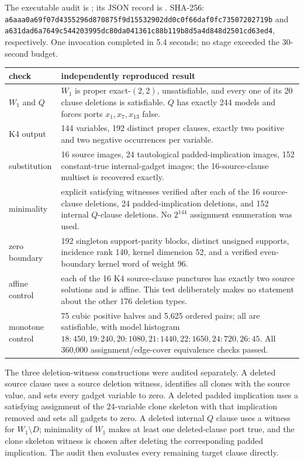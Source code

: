 \documentclass[11pt]{article}
\begin{document}
The executable audit is
; its JSON record is
.  SHA-256:
\texttt{a6aaa0a69f07d4355296d870875f9d15532902dd0c0f66daf0fc73507202719b}
and
\texttt{a631dad6a7649c544203995dc80da041361c88b119b8d5a4d848d2501cd63ed4},
respectively.  One invocation completed in 5.4 seconds; no stage exceeded the
30-second budget.

\begin{center}
\begin{tabularx}{\linewidth}{@{}lX@{}}
\toprule
check & independently reproduced result\\
\midrule
$W_1$ and $Q$ & $W_1$ is proper exact-$(2,2)$, unsatisfiable, and every one
of its 20 clause deletions is satisfiable.  $Q$ has exactly 244 models and
forces ports $x_1,x_7,x_{13}$ false.\\
K4 output & 144 variables, 192 distinct proper clauses, exactly two positive
and two negative occurrences per variable.\\
substitution & 16 source images, 24 tautological padded-implication images,
152 constant-true internal-gadget images; the 16-source-clause multiset is
recovered exactly.\\
minimality & explicit satisfying witnesses verified after each of the 16
source-clause deletions, 24 padded-implication deletions, and 152 internal
$Q$-clause deletions.  No $2^{144}$ assignment enumeration was used.\\
zero boundary & 192 singleton support-parity blocks, distinct unsigned
supports, incidence rank 140, kernel dimension 52, and a verified even-boundary
kernel word of weight 96.\\
affine control & each of the 16 K4 source-clause punctures has exactly two
source solutions and is affine.  This test deliberately makes no statement
about the other 176 deletion types.\\
monotone control & 75 cubic positive halves and 5,625 ordered pairs; all are
satisfiable, with model histogram
$18{:}450,19{:}240,20{:}1080,21{:}1440,22{:}1650,24{:}720,26{:}45$.
All 360,000 assignment/edge-cover equivalence checks passed.\\
\bottomrule
\end{tabularx}
\end{center}

The three deletion-witness constructions were audited separately.  A deleted
source clause uses a source deletion witness, identifies all clones with the
source value, and sets every gadget variable to zero.  A deleted padded
implication uses a satisfying assignment of the 24-variable clone skeleton
with that implication removed and sets all gadgets to zero.  A deleted
internal $Q$ clause uses a witness for $W_1\setminus D$; minimality of $W_1$
makes at least one deleted-clause port true, and the clone skeleton witness is
chosen after deleting the corresponding padded implication.  The audit then
evaluates every remaining target clause directly.
\end{document}
